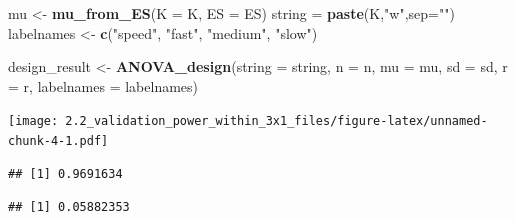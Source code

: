 \documentclass[]{article}
\newenvironment{Shaded}{\begin{snugshade}}{\end{snugshade}}
\newcommand{\KeywordTok}[1]{\textcolor[rgb]{0.13,0.29,0.53}{\textbf{#1}}}
\newcommand{\DataTypeTok}[1]{\textcolor[rgb]{0.13,0.29,0.53}{#1}}
\newcommand{\DecValTok}[1]{\textcolor[rgb]{0.00,0.00,0.81}{#1}}
\newcommand{\StringTok}[1]{\textcolor[rgb]{0.31,0.60,0.02}{#1}}
\newcommand{\OperatorTok}[1]{\textcolor[rgb]{0.81,0.36,0.00}{\textbf{#1}}}
\newcommand{\NormalTok}[1]{#1}
\begin{document}
\begin{Shaded}
\begin{Highlighting}[]
\NormalTok{mu <-}\StringTok{ }\KeywordTok{mu_from_ES}\NormalTok{(}\DataTypeTok{K =}\NormalTok{ K, }\DataTypeTok{ES =}\NormalTok{ ES)}
\NormalTok{string =}\StringTok{ }\KeywordTok{paste}\NormalTok{(K,}\StringTok{"w"}\NormalTok{,}\DataTypeTok{sep=}\StringTok{""}\NormalTok{)}
\NormalTok{labelnames <-}\StringTok{ }\KeywordTok{c}\NormalTok{(}\StringTok{"speed"}\NormalTok{, }\StringTok{"fast"}\NormalTok{, }\StringTok{"medium"}\NormalTok{, }\StringTok{"slow"}\NormalTok{)}

\NormalTok{design_result <-}\StringTok{ }\KeywordTok{ANOVA_design}\NormalTok{(}\DataTypeTok{string =}\NormalTok{ string,}
                   \DataTypeTok{n =}\NormalTok{ n, }
                   \DataTypeTok{mu =}\NormalTok{ mu, }
                   \DataTypeTok{sd =}\NormalTok{ sd, }
                   \DataTypeTok{r =}\NormalTok{ r, }
                   \DataTypeTok{labelnames =}\NormalTok{ labelnames)}
\end{Highlighting}
\end{Shaded}

\texttt{[image: 2.2\_validation\_power\_within\_3x1\_files/figure-latex/unnamed-chunk-4-1.pdf]}

\begin{Shaded}
\end{Shaded}

\begin{verbatim}
## [1] 0.9691634
\end{verbatim}

\begin{Shaded}
\end{Shaded}

\begin{verbatim}
## [1] 0.05882353
\end{verbatim}

\begin{Shaded}
\end{Shaded}
\end{document}

